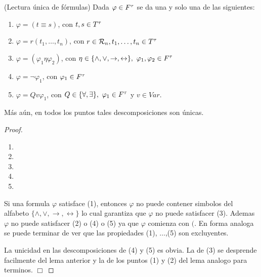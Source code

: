   \begin{theorem} \label{lemma_41}
    \PN (Lectura única de fórmulas) Dada $\varphi \in F^{\tau}$ se da una y solo una de las siguientes:
    \begin{enumerate}[(1)]
      \item $\varphi = (t \equiv s)$, con $t, s \in T^{\tau}$
      \item $\varphi = r(t_{1}, \dotsc, t_{n})$, con $r \in \mathcal{R}_{n}, t_{1}, \dotsc, t_{n} \in T^{\tau}$
      \item $\varphi = (\varphi_{1} \eta \varphi_{2})$, con $\eta \in \{\wedge, \vee, \rightarrow, \leftrightarrow\}, \
        \varphi_{1}, \varphi_{2} \in F^{\tau}$
      \item $\varphi = \lnot \varphi_{1}$, con $\varphi_{1} \in F^{\tau}$
      \item $\varphi = Qv \varphi_{1}$, con $Q \in \{\forall, \exists\}, \ \varphi_{1} \in F^{\tau}$ y $v \in Var$.
    \end{enumerate}

    \PN Más aún, en todos los puntos tales descomposiciones son únicas.
  \end{theorem}
  \begin{proof}
    \begin{enumerate}[(1)]
      \item
      \item
      \item
      \item
      \item
    \end{enumerate}

    Si una formula $\varphi $ satisface (1), entonces $\varphi $ no puede contener simbolos del alfabeto $\{\wedge ,\vee,
    \rightarrow ,\leftrightarrow \}$ lo cual garantiza que $\varphi $ no puede satisfacer (3). Ademas $ \varphi $ no
    puede satisfacer (2) o (4) o (5) ya que $\varphi $ comienza con $($. En forma analoga se puede terminar de ver que
    las propiedades (1), $\dotsc$,(5) son excluyentes.

    La unicidad en las descomposiciones de (4) y (5) es obvia. La de (3) se desprende facilmente del lema anterior y la de los puntos (1) y (2) del lema analogo para terminos. $\Box$
  \end{proof}

